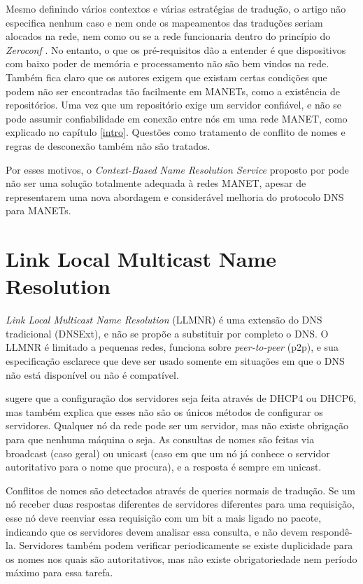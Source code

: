     Mesmo definindo vários contextos e várias estratégias de tradução, o artigo
    não especifica nenhum caso e nem onde os mapeamentos das traduções seriam
    alocados na rede, nem como ou se a rede funcionaria dentro do princípio do
    \textit{Zeroconf} \cite{zeroconf}. No entanto, o que os pré-requisitos dão
    a entender é que dispositivos com baixo poder de memória e processamento
    não são bem vindos na rede. Também fica claro que os autores exigem que
    existam certas condições que podem não ser encontradas tão facilmente em
    MANETs, como a existência de repositórios. Uma vez que um repositório exige
    um servidor confiável, e não se pode assumir confiabilidade em conexão entre
    nós em uma rede MANET, como explicado no capítulo \ref{intro}. Questões como
    tratamento de conflito de nomes e regras de desconexão também não são tratados.
    
    Por esses motivos, o \textit{Context-Based Name Resolution Service} proposto
    por \cite{context-dns} pode não ser uma solução totalmente adequada à
    redes MANET, apesar de representarem uma nova abordagem e considerável melhoria
    do protocolo DNS \cite{rfc1035} para MANETs.

\section{Link Local Multicast Name Resolution}

    \textit{Link Local Multicast Name Resolution} (LLMNR) \cite{llmnr} é uma
    extensão do DNS tradicional (DNSExt), e não se propõe a substituir por
    completo o DNS. O LLMNR é limitado a pequenas redes, funciona sobre
    \textit{peer-to-peer} (p2p), e sua especificação esclarece que deve ser usado
    somente em situações em que o DNS não está disponível ou não é compatível.
    
    \cite{llmnr} sugere que a configuração dos servidores seja feita através de
    DHCP4 ou DHCP6, mas também explica que esses não são os únicos métodos de
    configurar os servidores. Qualquer nó da rede pode ser um servidor, mas não
    existe obrigação para que nenhuma máquina o seja. As consultas de nomes são
    feitas via broadcast (caso geral) ou unicast (caso em que um nó já conhece o
    servidor autoritativo para o nome que procura), e a resposta é sempre em unicast.
    
    Conflitos de nomes são detectados através de queries normais de tradução. Se
    um nó receber duas respostas diferentes de servidores diferentes para uma
    requisição, esse nó deve reenviar essa requisição com um bit a mais ligado
    no pacote, indicando que os servidores devem analisar essa consulta, e não
    devem respondê-la. Servidores também podem verificar periodicamente se existe
    duplicidade para os nomes nos quais são autoritativos, mas não existe
    obrigatoriedade nem período máximo para essa tarefa.
    

